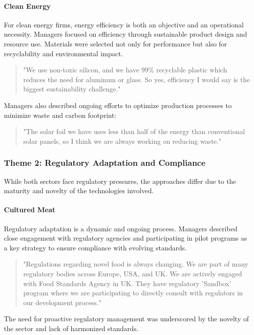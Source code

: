 \paragraph{Clean Energy}
For clean energy firms, energy efficiency is both an objective and an operational necessity. Managers focused on efficiency through sustainable product design and resource use. Materials were selected not only for performance but also for recyclability and environmental impact.
\begin{quote}
	"We use non-toxic silicon, and we have 99\% recyclable plastic which reduces the need for aluminum or glass. So yes, efficiency I would say is the biggest sustainability challenge."
\end{quote}
Managers also described ongoing efforts to optimize production processes to minimize waste and carbon footprint:
\begin{quote}
	"The solar foil we have uses less than half of the energy than conventional solar panels, so I think we are always working on reducing waste."
\end{quote}

\subsubsection{Theme 2: Regulatory Adaptation and Compliance}
While both sectors face regulatory pressures, the approaches differ due to the maturity and novelty of the technologies involved.

\paragraph{Cultured Meat}
Regulatory adaptation is a dynamic and ongoing process. Managers described close engagement with regulatory agencies and participating in pilot programs as a key strategy to ensure compliance with evolving standards.
\begin{quote}
	"Regulations regarding novel food is always changing. We are part of many regulatory bodies across Europe, USA, and UK. We are actively engaged with Food Standards Agency in UK. They have regulatory 'Sandbox' program where we are participating to directly consult with regulators in our development process."
\end{quote}
The need for proactive regulatory management was underscored by the novelty of the sector and lack of harmonized standards.

